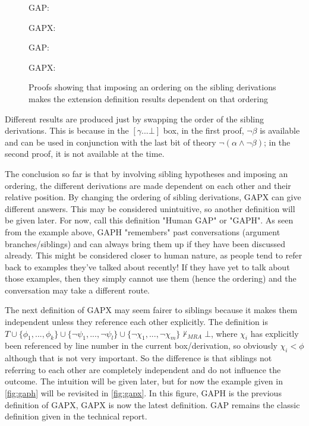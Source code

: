 \documentclass[11pt,twoside,a4paper]{report}
\newcommand{\cmark}{\ding{51}}
\newcommand{\xmark}{\ding{55}}
\begin{document}
\begin{figure}[htp]
\begin{minipage}[c]{.5\linewidth}
GAP: \cmark

GAPX: \xmark
\end{minipage}%
\begin{minipage}[c]{.5\linewidth}
GAP: \cmark

GAPX: \cmark
\end{minipage}%
\caption{Proofs showing that imposing an ordering on the sibling derivations makes the extension definition results dependent on that ordering\label{fig:gaph}}
\end{figure}

Different results are produced just by swapping the order of the sibling derivations. This is because in the $[\gamma ... \bot]$ box, in the first proof, $\neg\beta$ is available and can be used in conjunction with the last bit of theory $\neg(\alpha\wedge\neg\beta)$; in the second proof, it is not available at the time.

The conclusion so far is that by involving sibling hypotheses and imposing an ordering, the different derivations are made dependent on each other and their relative position. By changing the ordering of sibling derivations, GAPX can give different answers. This may be considered unintuitive, so another definition will be given later. For now, call this definition "Human GAP" or "GAPH". As seen from the example above, GAPH "remembers" past conversations (argument branches/siblings) and can always bring them up if they have been discussed already. This might be considered closer to human nature, as people tend to refer back to examples they've talked about recently! If they have yet to talk about those examples, then they simply cannot use them (hence the ordering) and the conversation may take a different route.

The next definition of GAPX may seem fairer to siblings because it makes them independent unless they reference each other explicitly. The definition is $T\cup\{\phi_1, ..., \phi_k\}\cup\{\neg\psi_1, ..., \neg\psi_l\}\cup\{\neg\chi_1, ..., \neg\chi_m\}\nvdash_{MRA}\bot$, where $\chi_i$ has explicitly been referenced by line number in the current box/derivation, so obviously $\chi_i < \phi$ although that is not very important. So the difference is that siblings not referring to each other are completely independent and do not influence the outcome. The intuition will be given later, but for now the example given in \autoref{fig:gaph} will be revisited in \autoref{fig:gapx}. In this figure, GAPH is the previous definition of GAPX, GAPX is now the latest definition. GAP remains the classic definition given in the technical report.
\end{document}
